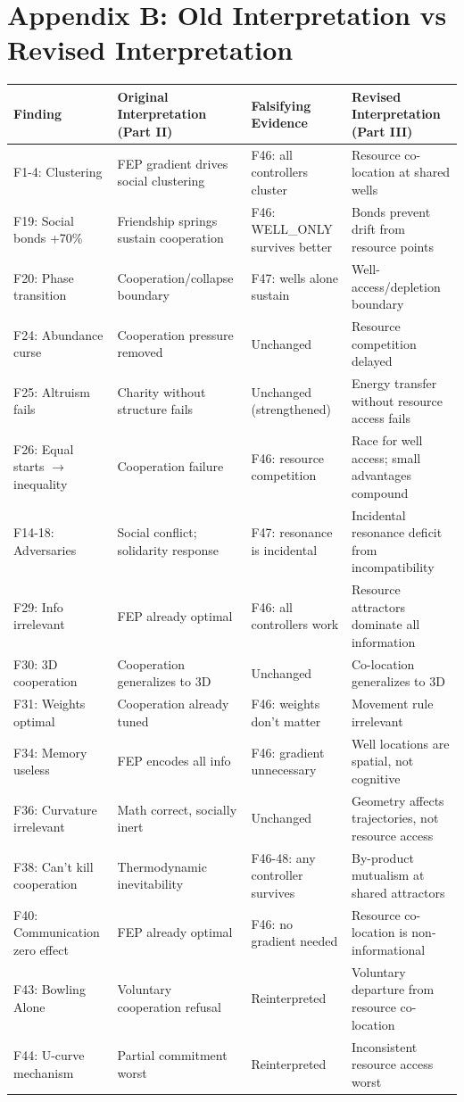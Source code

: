\chapter{Appendix B: Old Interpretation vs Revised Interpretation}\label{appendix-b-old-interpretation-vs-revised-interpretation}

\begin{longtable}[]{@{}llll@{}}
\toprule\noalign{}
Finding & Original Interpretation (Part II) & Falsifying Evidence & Revised Interpretation (Part III) \\
\midrule\noalign{}
\endhead
\bottomrule\noalign{}
\endlastfoot
F1-4: Clustering & FEP gradient drives social clustering & F46: all controllers cluster & Resource co-location at shared wells \\
F19: Social bonds +70\% & Friendship springs sustain cooperation & F46: WELL\_ONLY survives better & Bonds prevent drift from resource points \\
F20: Phase transition & Cooperation/collapse boundary & F47: wells alone sustain & Well-access/depletion boundary \\
F24: Abundance curse & Cooperation pressure removed & Unchanged & Resource competition delayed \\
F25: Altruism fails & Charity without structure fails & Unchanged (strengthened) & Energy transfer without resource access fails \\
F26: Equal starts $\to$ inequality & Cooperation failure & F46: resource competition & Race for well access; small advantages compound \\
F14-18: Adversaries & Social conflict; solidarity response & F47: resonance is incidental & Incidental resonance deficit from incompatibility \\
F29: Info irrelevant & FEP already optimal & F46: all controllers work & Resource attractors dominate all information \\
F30: 3D cooperation & Cooperation generalizes to 3D & Unchanged & Co-location generalizes to 3D \\
F31: Weights optimal & Cooperation already tuned & F46: weights don't matter & Movement rule irrelevant \\
F34: Memory useless & FEP encodes all info & F46: gradient unnecessary & Well locations are spatial, not cognitive \\
F36: Curvature irrelevant & Math correct, socially inert & Unchanged & Geometry affects trajectories, not resource access \\
F38: Can't kill cooperation & Thermodynamic inevitability & F46-48: any controller survives & By-product mutualism at shared attractors \\
F40: Communication zero effect & FEP already optimal & F46: no gradient needed & Resource co-location is non-informational \\
F43: Bowling Alone & Voluntary cooperation refusal & Reinterpreted & Voluntary departure from resource co-location \\
F44: U-curve mechanism & Partial commitment worst & Reinterpreted & Inconsistent resource access worst \\
\end{longtable}
